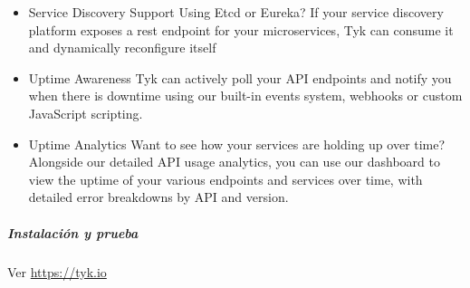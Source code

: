 \begin{itemize}
  \item Service Discovery Support Using Etcd or Eureka? If your service discovery platform exposes a rest endpoint for your microservices, Tyk can consume it and dynamically reconfigure itself
  \item Uptime Awareness Tyk can actively poll your API endpoints and notify you when there is downtime using our built-in events system, webhooks or custom JavaScript scripting.
  \item Uptime Analytics Want to see how your services are holding up over time? Alongside our detailed API usage analytics, you can use our dashboard to view the uptime of your various endpoints and services over time, with detailed error breakdowns by API and version.
\end{itemize}

\subparagraph{Instalación y prueba}

Ver \url{https://tyk.io}
